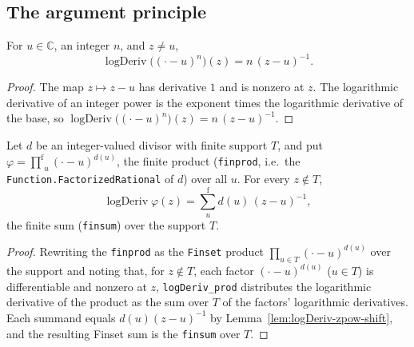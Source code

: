\subsection{The argument principle}

\begin{lemma}
    \label{lem:logDeriv-zpow-shift}
    \leanok
    For $u \in \mathbb{C}$, an integer $n$, and $z \neq u$,
    \[
        \operatorname{logDeriv}\big((\cdot - u)^{n}\big)(z) = n\,(z-u)^{-1}.
    \]
\end{lemma}
\begin{proof}
    The map $z \mapsto z - u$ has derivative $1$ and is nonzero at $z$. The
    logarithmic derivative of an integer power is the exponent times the
    logarithmic derivative of the base, so
    $\operatorname{logDeriv}\big((\cdot-u)^{n}\big)(z) = n\,(z-u)^{-1}$.
\end{proof}

\begin{lemma}
    \label{lem:logDeriv-factorizedRational}
    \leanok
    Let $d$ be an integer-valued divisor with finite support $T$, and put
    $\varphi = \operatorname*{{\textstyle\prod}^{\mathrm f}}_{u}(\cdot - u)^{d(u)}$,
    the finite product (\texttt{finprod}, i.e.\ the
    \texttt{Function.FactorizedRational} of $d$) over all $u$. For every
    $z \notin T$,
    \[
        \operatorname{logDeriv}\varphi(z)
          = \operatorname*{{\textstyle\sum}^{\mathrm f}}_{u} d(u)\,(z-u)^{-1},
    \]
    the finite sum (\texttt{finsum}) over the support $T$.
\end{lemma}
\begin{proof}
    Rewriting the \texttt{finprod} as the \texttt{Finset} product
    $\prod_{u\in T}(\cdot-u)^{d(u)}$ over the support and noting that, for
    $z \notin T$, each factor $(\cdot-u)^{d(u)}$ ($u \in T$) is differentiable and
    nonzero at $z$, \texttt{logDeriv\_prod} distributes the logarithmic derivative
    of the product as the sum over $T$ of the factors' logarithmic derivatives.
    Each summand equals $d(u)(z-u)^{-1}$ by
    Lemma~\ref{lem:logDeriv-zpow-shift}, and the resulting Finset sum is the
    \texttt{finsum} over $T$.
\end{proof}

